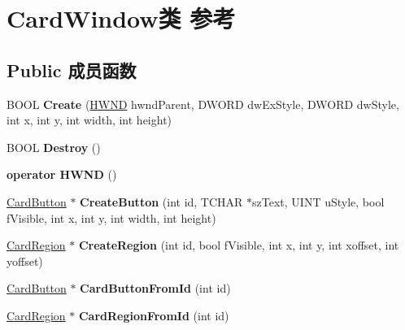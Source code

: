 \hypertarget{class_card_window}{}\section{Card\+Window类 参考}
\label{class_card_window}
\subsection*{Public 成员函数}
\begin{DoxyCompactItemize}
\item 
\mbox{\label{class_card_window_a82865ed23f6bc8f29a0603f174a50b3d}} 
B\+O\+OL {\bfseries Create} (\hyperlink{interfacevoid}{H\+W\+ND} hwnd\+Parent, D\+W\+O\+RD dw\+Ex\+Style, D\+W\+O\+RD dw\+Style, int x, int y, int width, int height)
\item 
\mbox{\label{class_card_window_a4f8100526e865dfe5985ede1545cca1b}} 
B\+O\+OL {\bfseries Destroy} ()
\item 
\mbox{\label{class_card_window_ac60a6a8cc4836c084407f38868c16e1a}} 
{\bfseries operator H\+W\+ND} ()
\item 
\mbox{\label{class_card_window_a9ce799fd7f4318576874adfc889ddb80}} 
\hyperlink{class_card_button}{Card\+Button} $\ast$ {\bfseries Create\+Button} (int id, T\+C\+H\+AR $\ast$sz\+Text, U\+I\+NT u\+Style, bool f\+Visible, int x, int y, int width, int height)
\item 
\mbox{\label{class_card_window_a936ca7b36a230953cfb7b37c07d600f2}} 
\hyperlink{class_card_region}{Card\+Region} $\ast$ {\bfseries Create\+Region} (int id, bool f\+Visible, int x, int y, int xoffset, int yoffset)
\item 
\mbox{\label{class_card_window_aa64124d057ebd885ad8b70fa96a73f6c}} 
\hyperlink{class_card_button}{Card\+Button} $\ast$ {\bfseries Card\+Button\+From\+Id} (int id)
\item 
\mbox{\label{class_card_window_a4b1848b79670f9edac679e131ddc71c7}} 
\hyperlink{class_card_region}{Card\+Region} $\ast$ {\bfseries Card\+Region\+From\+Id} (int id)
\item 

\end{DoxyCompactItemize}
